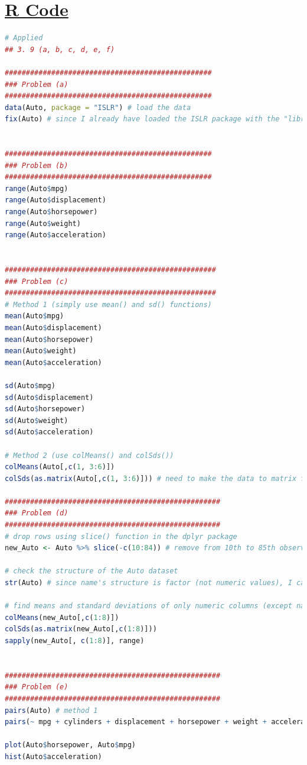\documentclass{article}
\begin{document}
\section*{\underline{R Code}}
\begin{lstlisting}[language=R]
# Applied
## 3. 9 (a, b, c, d, e, f)

#################################################
### Problem (a)
#################################################
data(Auto, package = "ISLR") # load the data
fix(Auto) # since I already have loaded the ISLR package with the "library" command, I don't need to use "read.table" command to load the "Auto" data. It is already loaded in R. I can view the file using the command "fix(Auto)".


#################################################
### Problem (b)
#################################################
range(Auto$mpg)
range(Auto$displacement)
range(Auto$horsepower)
range(Auto$weight)
range(Auto$acceleration)


##################################################
### Problem (c)
##################################################
# Method 1 (simply use mean() and sd() functions)
mean(Auto$mpg)
mean(Auto$displacement)
mean(Auto$horsepower)
mean(Auto$weight)
mean(Auto$acceleration)

sd(Auto$mpg)
sd(Auto$displacement)
sd(Auto$horsepower)
sd(Auto$weight)
sd(Auto$acceleration)

# Method 2 (use colMeans() and colSds())
colMeans(Auto[,c(1, 3:6)])
colSds(as.matrix(Auto[,c(1, 3:6)])) # need to make the data to matrix form

###################################################
### Problem (d)
###################################################
# drop rows using slice() function in the dplyr package
new_Auto <- Auto %>% slice(-c(10:84)) # remove from 10th to 85th observations

# check the structure of the Auto dataset
str(Auto) # since name's structure is factor (not numeric values), I cannot get mean and standard deviation with the name column.

# find means and standard deviations of only numeric columns (except name)
colMeans(new_Auto[,c(1:8)])
colSds(as.matrix(new_Auto[,c(1:8)]))
sapply(new_Auto[, c(1:8)], range)


###################################################
### Problem (e)
###################################################
pairs(Auto) # method 1
pairs(~ mpg + cylinders + displacement + horsepower + weight + acceleration + year + origin + name, Auto) # method 2

plot(Auto$horsepower, Auto$mpg)
hist(Auto$acceleration)
\end{lstlisting}
\end{document}
